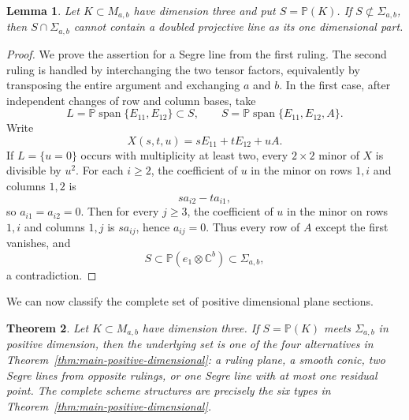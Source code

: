 \documentclass[11pt]{amsart}
\newcommand{\chg}[1]{#1}
\newcommand{\Span}{\operatorname{span}}
\theoremstyle{plain}
\newtheorem{theorem}{Theorem}[section]
\newtheorem{lemma}[theorem]{Lemma}
\theoremstyle{definition}
\theoremstyle{remark}
\begin{document}
\begin{lemma}\label{lem:no-double-line}
Let $K\subset M_{a,b}$ have dimension three and put $S=\mathbb P(K)$. If $S\not\subset\Sigma_{a,b}$, then $S\cap\Sigma_{a,b}$ cannot contain a doubled projective line as its \chg{one dimensional} part.
\end{lemma}

\begin{proof}
{We prove the assertion for a Segre line from the first ruling. The second ruling is handled by interchanging the two tensor factors, equivalently by transposing the entire argument and exchanging $a$ and $b$. In the first case, after independent changes of row and column bases, take}
\[
L=\mathbb P\Span\{E_{11},E_{12}\}\subset S,
\qquad
S=\mathbb P\Span\{E_{11},E_{12},A\}.
\]
Write
\[
X(s,t,u)=sE_{11}+tE_{12}+uA.
\]
If $L=\{u=0\}$ occurs with multiplicity at least two, every $2\times2$ minor of $X$ is divisible by $u^2$. For each $i\ge2$, the coefficient of $u$ in the minor on rows $1,i$ and columns $1,2$ is
\[
s a_{i2}-t a_{i1},
\]
so $a_{i1}=a_{i2}=0$. Then for every $j\ge3$, the coefficient of $u$ in the minor on rows $1,i$ and columns $1,j$ is $s a_{ij}$, hence $a_{ij}=0$. Thus every row of $A$ except the first vanishes, and
\[
S\subset\mathbb P(e_1\otimes\mathbb C^b)\subset\Sigma_{a,b},
\]
a contradiction.
\end{proof}

\chg{We can now classify the complete set of positive dimensional plane sections.}

\begin{theorem}\label{thm:positive-plane-sections}
Let $K\subset M_{a,b}$ have dimension three. If $S=\mathbb P(K)$ meets $\Sigma_{a,b}$ in positive dimension, then the underlying set is one of the four alternatives in Theorem~\ref{thm:main-positive-dimensional}: a ruling plane, a smooth conic, two \chg{Segre lines from opposite rulings}, or one Segre line with at most one residual point. The complete scheme structures are precisely the six types in Theorem~\ref{thm:main-positive-dimensional}.
\end{theorem}
\end{document}
